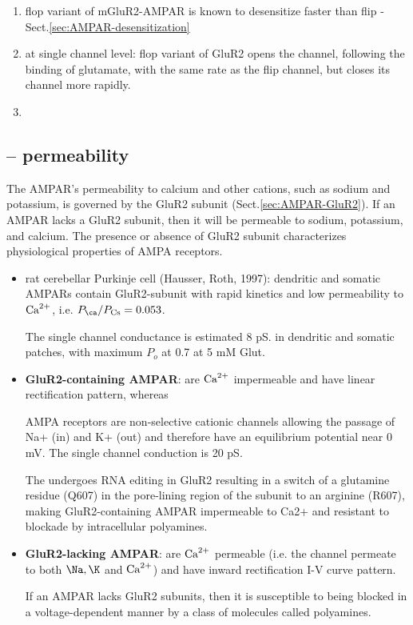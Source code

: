 \begin{enumerate}
  \item flop variant of mGluR2-AMPAR is known to desensitize faster 
  than flip - Sect.\ref{sec:AMPAR-desensitization}
  
  \item at single channel level: flop variant of GluR2 opens the channel,
  following the binding of glutamate, with the same rate as the flip channel,
  but closes its channel more rapidly.
  

  
  \item 
\end{enumerate}


\subsection{-- permeability}
\label{sec:AMPAR-permeability}

The AMPAR's permeability to calcium and other cations, such as sodium and
potassium, is governed by the GluR2 subunit (Sect.\ref{sec:AMPAR-GluR2}). If an
AMPAR lacks a GluR2 subunit, then it will be permeable to sodium, potassium, and
calcium. The presence or absence of GluR2 subunit characterizes physiological
properties of AMPA receptors.


\begin{itemize}

  \item rat cerebellar Purkinje cell (Hausser, Roth, 1997): dendritic and
  somatic AMPARs contain GluR2-subunit with rapid kinetics and low 
  permeability to ${\text{Ca}^{2+}}$, i.e. $P_\ca/P_{\text{Cs}} = 0.053$.
  
  The single channel conductance is estimated 8 pS. in dendritic and somatic
  patches, with maximum $P_o$ at 0.7 at 5 mM Glut.

  \item  {\bf GluR2-containing AMPAR}: are ${\text{Ca}^{2+}}$ impermeable and have
  linear rectification pattern, whereas 

AMPA receptors are non-selective cationic channels allowing the passage of Na+
(in) and K+ (out) and therefore have an equilibrium potential near 0 mV.
The single channel conduction is 20 pS.

The undergoes RNA editing in GluR2 resulting in a switch of a glutamine residue
(Q607) in the pore-lining region of the subunit to an arginine (R607),
making GluR2-containing AMPAR impermeable to Ca2+ and resistant to blockade by
intracellular polyamines.
 
  \item {\bf GluR2-lacking AMPAR}: are ${\text{Ca}^{2+}}$ permeable (i.e. the channel
  permeate to both $\Na, \K$ and ${\text{Ca}^{2+}}$) and have inward rectification I-V curve
  pattern.

If an AMPAR lacks GluR2 subunits, then it is susceptible to being blocked in a
voltage-dependent manner by a class of molecules called polyamines.
  
\end{itemize}


